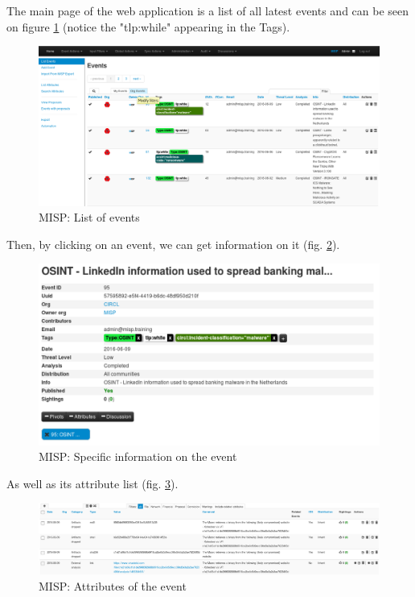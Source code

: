 \documentclass{eplmastersthesis}
\begin{document}
The main page of the web application is a list of all latest events and can be seen on figure \ref{webevents} (notice the "tlp:while" appearing in the Tags).

\begin{figure}[!h]
	\begin{center}
		\includegraphics[scale=0.32]{res/webEvents}
		\caption{MISP: List of events}
		\label{webevents}
	\end{center}
\end{figure}


Then, by clicking on an event, we can get information on it (fig. \ref{webevent}).


\begin{figure}[!h]
	\begin{center}
		\includegraphics[scale=0.35]{res/webEvent}
		\caption{MISP: Specific information on the event}
		\label{webevent}
	\end{center}
\end{figure}


As well as its attribute list (fig. \ref{webattributes}).
\begin{figure}[!h]
	\begin{center}
		\includegraphics[scale=0.35]{res/webAttributes}
		\caption{MISP: Attributes of the event}
		\label{webattributes}
	\end{center}
\end{figure}
\end{document}
